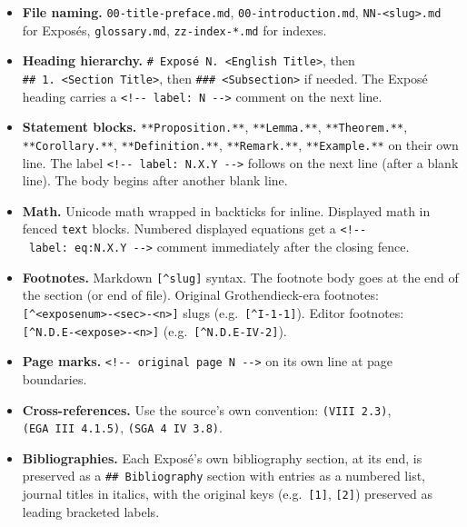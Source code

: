 \documentclass[
  11pt,
  a4paper,
]{book}
\providecommand{\tightlist}{%
  \setlength{\itemsep}{0pt}\setlength{\parskip}{0pt}}
\begin{document}
\begin{itemize}
\tightlist
\item
  \textbf{File naming.} \texttt{00-title-preface.md},
  \texttt{00-introduction.md},
  \texttt{NN-\textless{}slug\textgreater{}.md} for Exposés,
  \texttt{glossary.md}, \texttt{zz-index-*.md} for indexes.
\item
  \textbf{Heading hierarchy.}
  \texttt{\#\ Exposé\ N.\ \textless{}English\ Title\textgreater{}}, then
  \texttt{\#\#\ 1.\ \textless{}Section\ Title\textgreater{}}, then
  \texttt{\#\#\#\ \textless{}Subsection\textgreater{}} if needed. The
  Exposé heading carries a
  \texttt{\textless{}!-\/-\ label:\ N\ -\/-\textgreater{}} comment on
  the next line.
\item
  \textbf{Statement blocks.} \texttt{**Proposition.**},
  \texttt{**Lemma.**}, \texttt{**Theorem.**}, \texttt{**Corollary.**},
  \texttt{**Definition.**}, \texttt{**Remark.**}, \texttt{**Example.**}
  on their own line. The label
  \texttt{\textless{}!-\/-\ label:\ N.X.Y\ -\/-\textgreater{}} follows
  on the next line (after a blank line). The body begins after another
  blank line.
\item
  \textbf{Math.} Unicode math wrapped in backticks for inline. Displayed
  math in fenced
  \texttt{\textasciigrave{}\textasciigrave{}\textasciigrave{}text}
  blocks. Numbered displayed equations get a
  \texttt{\textless{}!-\/-\ label:\ eq:N.X.Y\ -\/-\textgreater{}}
  comment immediately after the closing fence.
\item
  \textbf{Footnotes.} Markdown \texttt{{[}\^{}slug{]}} syntax. The
  footnote body goes at the end of the section (or end of file).
  Original Grothendieck-era footnotes:
  \texttt{{[}\^{}\textless{}exposenum\textgreater{}-\textless{}sec\textgreater{}-\textless{}n\textgreater{}{]}}
  slugs (e.g.~\texttt{{[}\^{}I-1-1{]}}). Editor footnotes:
  \texttt{{[}\^{}N.D.E-\textless{}expose\textgreater{}-\textless{}n\textgreater{}{]}}
  (e.g.~\texttt{{[}\^{}N.D.E-IV-2{]}}).
\item
  \textbf{Page marks.}
  \texttt{\textless{}!-\/-\ original\ page\ N\ -\/-\textgreater{}} on
  its own line at page boundaries.
\item
  \textbf{Cross-references.} Use the source's own convention:
  \texttt{(VIII\ 2.3)}, \texttt{(EGA\ III\ 4.1.5)},
  \texttt{(SGA\ 4\ IV\ 3.8)}.
\item
  \textbf{Bibliographies.} Each Exposé's own bibliography section, at
  its end, is preserved as a \texttt{\#\#\ Bibliography} section with
  entries as a numbered list, journal titles in italics, with the
  original keys (e.g.~\texttt{{[}1{]}}, \texttt{{[}2{]}}) preserved as
  leading bracketed labels.
\end{itemize}
\end{document}

